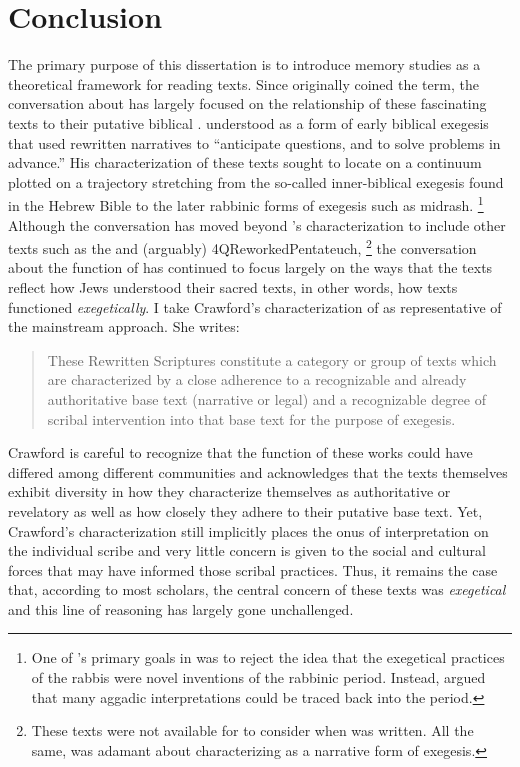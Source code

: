 
\chapter*{Conclusion}


The primary purpose of this dissertation is to introduce memory studies as a theoretical framework for reading \rwb texts. Since \Vermes originally coined the term, the conversation about \rwb has largely focused on the relationship of these fascinating texts to their putative biblical \vorlagen. \vermes understood \rwb as a form of early biblical exegesis that used rewritten narratives to ``anticipate questions, and to solve problems in advance.''%
    \autocite[95]{vermes1961}
His characterization of these texts sought to locate \rwb on a continuum plotted on a trajectory stretching from the so-called inner-biblical exegesis found in the Hebrew Bible to the later rabbinic forms of exegesis such as midrash.%
    \footnote{One of \vermes's primary goals in  was to reject the idea that the exegetical practices of the rabbis were novel inventions of the rabbinic period. Instead, \vermes argued that many aggadic interpretations could be traced back into the \secondtemple period.}
Although the conversation has moved beyond \vermes's characterization to include other texts such as the \templescroll and (arguably) 4QReworkedPentateuch,%
    \footnote{These texts were not available for \vermes to consider when  was written. All the same, \vermes was adamant about characterizing \rwb as a narrative form of exegesis.}    
the conversation about the function of \rwb has continued to focus largely on the ways that the \rwb texts reflect how \secondtemple Jews understood their sacred texts, in other words, how \rwb texts functioned \emph{exegetically}. I take Crawford's characterization of  \rwb as representative of the mainstream approach. She writes:
\begin{quote}
    These Rewritten Scriptures constitute a category or group of texts which are characterized by a close adherence to a recognizable and already authoritative base text (narrative or legal) and a recognizable degree of scribal intervention into that base text for the purpose of exegesis.\autocite[12--13]{crawford2008}
\end{quote}
\noindent
Crawford is careful to recognize that the function of these works could have differed among different communities and acknowledges that the texts themselves exhibit diversity in how they characterize themselves as authoritative or revelatory as well as how closely they adhere to their putative base text.%
    \autocite[13]{crawford2008}
Yet, Crawford's characterization still implicitly places the onus of interpretation on the individual scribe and very little concern is given to the social and cultural forces that may have informed those scribal practices. Thus, it remains the case that, according to most scholars, the central concern of these texts was \emph{exegetical} and this line of reasoning has largely gone unchallenged. 

